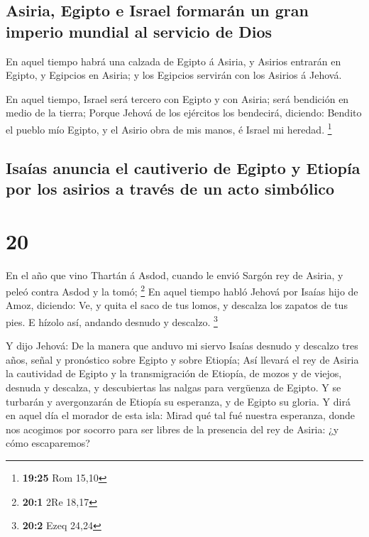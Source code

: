 \hypertarget{asiria-egipto-e-israel-formaruxe1n-un-gran-imperio-mundial-al-servicio-de-dios}{%
\subsection{Asiria, Egipto e Israel formarán un gran imperio mundial al
servicio de
Dios}\label{asiria-egipto-e-israel-formaruxe1n-un-gran-imperio-mundial-al-servicio-de-dios}}

 En aquel tiempo habrá una calzada de Egipto á Asiria, y
Asirios entrarán en Egipto, y Egipcios en Asiria; y los Egipcios
servirán con los Asirios á Jehová.

 En aquel tiempo, Israel será tercero con Egipto y con
Asiria; será bendición en medio de la tierra;  Porque
Jehová de los ejércitos los bendecirá, diciendo: Bendito el pueblo mío
Egipto, y el Asirio obra de mis manos, é Israel mi heredad. \footnote{\textbf{19:25}
  Rom 15,10}

\hypertarget{isauxedas-anuncia-el-cautiverio-de-egipto-y-etiopuxeda-por-los-asirios-a-travuxe9s-de-un-acto-simbuxf3lico}{%
\subsection{Isaías anuncia el cautiverio de Egipto y Etiopía por los
asirios a través de un acto
simbólico}\label{isauxedas-anuncia-el-cautiverio-de-egipto-y-etiopuxeda-por-los-asirios-a-travuxe9s-de-un-acto-simbuxf3lico}}

\hypertarget{section-19}{%
\section{20}\label{section-19}}

 En el año que vino Thartán á Asdod, cuando le envió Sargón
rey de Asiria, y peleó contra Asdod y la tomó; \footnote{\textbf{20:1}
  2Re 18,17}  En aquel tiempo habló Jehová por Isaías hijo
de Amoz, diciendo: Ve, y quita el saco de tus lomos, y descalza los
zapatos de tus pies. E hízolo así, andando desnudo y descalzo.
\footnote{\textbf{20:2} Ezeq 24,24}

 Y dijo Jehová: De la manera que anduvo mi siervo Isaías
desnudo y descalzo tres años, señal y pronóstico sobre Egipto y sobre
Etiopía;  Así llevará el rey de Asiria la cautividad de
Egipto y la transmigración de Etiopía, de mozos y de viejos, desnuda y
descalza, y descubiertas las nalgas para vergüenza de Egipto.
 Y se turbarán y avergonzarán de Etiopía su esperanza, y de
Egipto su gloria.  Y dirá en aquel día el morador de esta
isla: Mirad qué tal fué nuestra esperanza, donde nos acogimos por
socorro para ser libres de la presencia del rey de Asiria: ¿y cómo
escaparemos?

